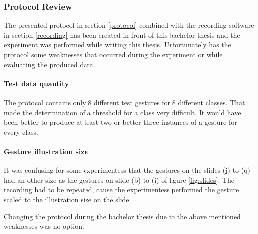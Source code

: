 \subsubsection{Protocol Review} \label{protocol_review}
The presented protocol in section \ref{protocol} combined with the recording software in section \ref{recording} has
been created in front of this bachelor thesis and the experiment was performed while writing this thesis. Unfortunately
has the protocol some weaknesses that occurred during the experiment or while evaluating the produced data.

\paragraph{Test data quantity} The protocol contains only 8 different test gestures for 8 different classes. That made
the determination of a threshold for a class very difficult. It would have been better to produce at least two or better
three instances of a gesture for every class.

\paragraph{Gesture illustration size} It was confusing for some experimentess that the gestures on the slides (j) to (q)
had an other size as the gestures on slide (b) to (i) of figure \ref{fig:slides}. The recording had to be repeated,
cause the experimentess performed the gesture scaled to the illustration size on the slide.

Changing the protocol during the bachelor thesis due to the above mentioned weaknesses was no option.
